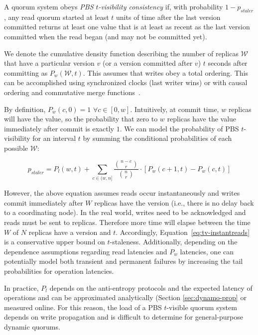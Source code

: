 \documentclass{vldb}
\begin{document}
\begin{definition}
A quorum system obeys \textit{PBS $t$-visibility consistency} if, with
probability $1-p_{staler}$, any read quorum started at least $t$ units
of time after the last version committed returns at least one value
that is at least as recent as the last version committed when the read
began (and may not be committed yet).
\end{definition}

We denote the cumulative density function describing the number
of replicas $\mathcal{W}$ that have a particular version $v$ (or a
version committed after $v$) $t$ seconds after committing as
$P_w(\mathcal{W}, t)$.  This assumes that writes obey a total
ordering. This can be accomplished using synchronized clocks (last
writer wins) or with causal ordering and commutative merge
functions~\cite{cops}.

By definition, $P_w(c,0) = 1$ $\forall c \in [0, w]$.  Intuitively, at
commit time, $w$ replicas will have the value, so the probability that
zero to $w$ replicas have the value immediately after commit is
exactly $1$.  We can model the probability of PBS $t$-visibility for
an interval $t$ by summing the conditional probabilities of each
possible $\mathcal{W}$:

\begin{equation}
\label{eq:tv-instantreads}
p_{staler} = P_l(w, t)+\sum_{c\in(w, n]} \frac{{n-c \choose r}}{{n \choose r}}\cdot [P_w(c+1, t)-P_w(c,t)]
\end{equation}

However, the above equation assumes reads occur instantaneously and
writes commit immediately after $W$ replicas have the version (i.e.,
there is no delay back to a coordinating node).  In the real world,
writes need to be acknowledged and reads must be sent to replicas.
Therefore more time will elapse between the time $W$ of $N$ replicas
have a version and $t$.  Accordingly,
Equation~\ref{eq:tv-instantreads} is a conservative upper bound on
$t$-staleness.  Additionally, depending on the dependence assumptions
regarding read latencies and $P_w$ latencies, one can potentially
model both transient and permanent failures by increasing the tail
probabilities for operation latencies.

In practice, $P_l$ depends on the anti-entropy protocols and the
expected latency of operations and can be approximated analytically
(Section \ref{sec:dynamo-prop} or measured online.  For this reason,
the load of a PBS $t$-visible quorum system depends on write
propagation and is difficult to determine for general-purpose dynamic
quorums.
\end{document}
